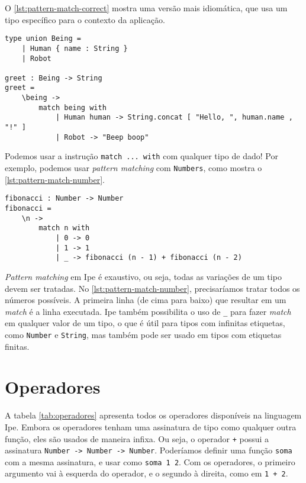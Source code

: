 O \autoref{lst:pattern-match-correct} mostra uma versão mais idiomática,
que usa um tipo específico para o contexto da aplicação.

\begin{lstlisting}[label={lst:pattern-match-correct},caption={Maneira idiomática da função greet}]
type union Being =
    | Human { name : String }
    | Robot

greet : Being -> String
greet =
    \being ->
        match being with
            | Human human -> String.concat [ "Hello, ", human.name , "!" ]
            | Robot -> "Beep boop"
\end{lstlisting}

Podemos usar a instrução \texttt{match ... with} com qualquer tipo de dado! Por
exemplo, podemos usar \textit{pattern matching} com \texttt{Numbers}, como mostra
o \autoref{lst:pattern-match-number}.

\begin{lstlisting}[label={lst:pattern-match-number},caption={Pattern matching com números}]
fibonacci : Number -> Number
fibonacci =
    \n ->
        match n with
            | 0 -> 0
            | 1 -> 1
            | _ -> fibonacci (n - 1) + fibonacci (n - 2)
\end{lstlisting}

\textit{Pattern matching} em Ipe é exaustivo, ou seja, todas as variações de um
tipo devem ser tratadas. No \autoref{lst:pattern-match-number}, precisaríamos
tratar todos os números possíveis. A primeira linha (de cima para baixo) que
resultar em um \textit{match} é a linha executada. Ipe também possibilita o uso
de \texttt{\_} para fazer \textit{match} em qualquer valor de um tipo, o que é
útil para tipos com infinitas etiquetas, como \texttt{Number} e \texttt{String},
mas também pode ser usado em tipos com etiquetas finitas.

\section{Operadores}

A tabela \autoref{tab:operadores} apresenta todos os operadores disponíveis na
linguagem Ipe. Embora os operadores tenham uma assinatura de tipo como qualquer
outra função, eles são usados de maneira infixa. Ou seja, o operador \texttt{+}
possui a assinatura \texttt{Number -> Number -> Number}. Poderíamos definir uma
função \texttt{soma} com a mesma assinatura, e usar como \texttt{soma 1 2}. Com
os operadores, o primeiro argumento vai à esquerda do operador, e o segundo à direita,
como em \texttt{1 + 2}.

